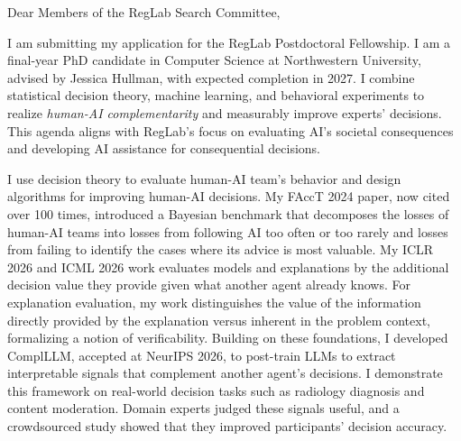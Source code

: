 Dear Members of the RegLab Search Committee,

I am submitting my application for the RegLab Postdoctoral Fellowship. 
I am a final-year PhD candidate in Computer Science at Northwestern University, advised by Jessica Hullman, with expected completion in 2027. 
I combine statistical decision theory, machine learning, and behavioral experiments to realize \emph{human-AI complementarity} and measurably improve experts' decisions.
This agenda aligns with RegLab's focus on evaluating AI's societal consequences and developing AI assistance for consequential decisions.

I use decision theory to evaluate human-AI team's behavior and design algorithms for improving human-AI decisions.
My FAccT 2024 paper, now cited over 100 times, introduced a Bayesian benchmark that decomposes the losses of human-AI teams into losses from following AI too often or too rarely and losses from failing to identify the cases where its advice is most valuable.
My ICLR 2026 and ICML 2026 work evaluates models and explanations by the additional decision value they provide given what another agent already knows.
For explanation evaluation, my work distinguishes the value of the information directly provided by the explanation versus inherent in the problem context, formalizing a notion of verificability.
Building on these foundations, I developed ComplLLM, accepted at NeurIPS 2026, to post-train LLMs to extract interpretable signals that complement another agent's decisions. 
I demonstrate this framework on real-world decision tasks such as radiology diagnosis and content moderation.
Domain experts judged these signals useful, and a crowdsourced study showed that they improved participants' decision accuracy.

